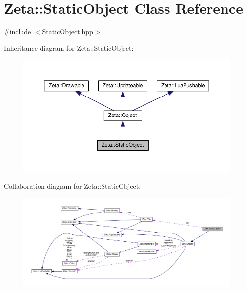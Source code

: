 \hypertarget{classZeta_1_1StaticObject}{\section{Zeta\+:\+:Static\+Object Class Reference}
\label{classZeta_1_1StaticObject}
}


{\ttfamily \#include $<$Static\+Object.\+hpp$>$}



Inheritance diagram for Zeta\+:\+:Static\+Object\+:\nopagebreak
\begin{figure}[H]
\begin{center}
\leavevmode
\includegraphics[width=350pt]{classZeta_1_1StaticObject__inherit__graph}
\end{center}
\end{figure}


Collaboration diagram for Zeta\+:\+:Static\+Object\+:\nopagebreak
\begin{figure}[H]
\begin{center}
\leavevmode
\includegraphics[width=350pt]{classZeta_1_1StaticObject__coll__graph}
\end{center}
\end{figure}
